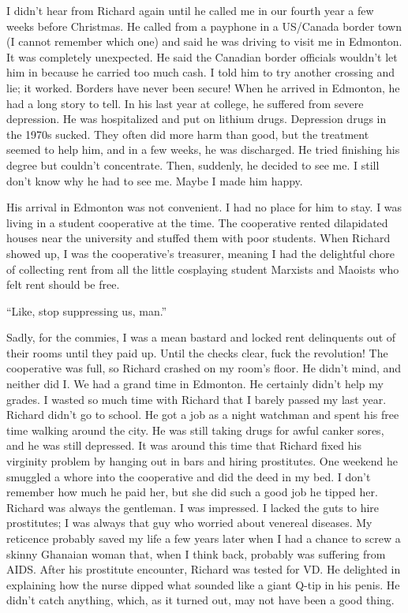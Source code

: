 I didn't hear from Richard again until he called me in our fourth year a
few weeks before Christmas. He called from a payphone in a US/Canada
border town (I cannot remember which one) and said he was driving to
visit me in Edmonton. It was completely unexpected. He said the Canadian
border officials wouldn't let him in because he carried too much cash. I
told him to try another crossing and lie; it worked. Borders have never
been secure! When he arrived in Edmonton, he had a long story to tell.
In his last year at college, he suffered from severe depression. He was
hospitalized and put on lithium drugs. Depression drugs in the 1970s
sucked. They often did more harm than good, but the treatment seemed to
help him, and in a few weeks, he was discharged. He tried finishing his
degree but couldn't concentrate. Then, suddenly, he decided to see me. I
still don't know why he had to see me. Maybe I made him happy.

His arrival in Edmonton was not convenient. I had no place for him to
stay. I was living in a student cooperative at the time. The cooperative
rented dilapidated houses near the university and stuffed them with poor
students. When Richard showed up, I was the cooperative's treasurer,
meaning I had the delightful chore of collecting rent from all the
little cosplaying student Marxists and Maoists who felt rent should be
free.

``Like, stop suppressing us, man.''

Sadly, for the commies, I was a mean bastard and locked rent delinquents
out of their rooms until they paid up. Until the checks clear, fuck the
revolution! The cooperative was full, so Richard crashed on my room's
floor. He didn't mind, and neither did I. We had a grand time in
Edmonton. He certainly didn't help my grades. I wasted so much time with
Richard that I barely passed my last year. Richard didn't go to school.
He got a job as a night watchman and spent his free time walking around
the city. He was still taking drugs for awful canker sores, and he was
still depressed. It was around this time that Richard fixed his
virginity problem by hanging out in bars and hiring prostitutes. One
weekend he smuggled a whore into the cooperative and did the deed in my
bed. I don't remember how much he paid her, but she did such a good job
he tipped her. Richard was always the gentleman. I was impressed. I
lacked the guts to hire prostitutes; I was always that guy who worried
about venereal diseases. My reticence probably saved my life a few years
later when I had a chance to screw a skinny Ghanaian woman that, when I
think back, probably was suffering from AIDS. After his prostitute
encounter, Richard was tested for VD. He delighted in explaining how the
nurse dipped what sounded like a giant Q-tip in his penis. He didn't
catch anything, which, as it turned out, may not have been a good thing.

